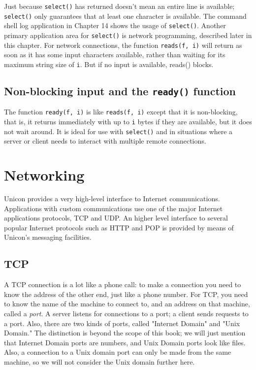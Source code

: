 
Just because \texttt{select()} has returned doesn't
mean an entire line is available; \texttt{select()} only guarantees
that at least one character is available. The command shell log
application in Chapter 14 shows the usage of \texttt{select()}. Another
primary application area for \texttt{select()} is network programming,
described later in this chapter. For network connections, the function
\texttt{reads(f, i)} will return as soon as it has some input
characters available, rather than waiting for its maximum string size
of \texttt{i}. But if no input is available, reads() blocks.

\subsection{Non-blocking input and the \texttt{ready()} function}

The function \texttt{ready(f, i)} is like \texttt{reads(f, i)} except
that it is non-blocking, that is, it returns immediately with up to
\texttt{i} bytes if they are available, but it does not wait around. It
is ideal for use with \texttt{select()} and in situations where a
server or client needs to interact with multiple remote connections.

\section[Networking]{Networking}
Unicon provides a very high-level interface to
Internet communications. Applications with custom
communications use one of the major Internet
applications protocols, TCP and UDP. An higher level
interface to several popular Internet protocols such as HTTP and POP is
provided by means of Unicon's messaging facilities.

\subsection{TCP}

A TCP connection is a lot like a phone call: to make a connection you
need to know the address of the other end, just like a phone number.
For TCP, you need to know the name of the machine to connect to, and an
address on that machine, called a \textit{port}. A server listens for
connections to a port; a client sends requests to a port. Also, there
are two kinds of ports, called "Internet
Domain" and "Unix Domain."
The distinction is beyond the scope of this book; we will just mention
that Internet Domain ports are numbers, and Unix Domain ports look like
files. Also, a connection to a Unix domain port can only be made from
the same machine, so we will not consider the Unix domain further here.

